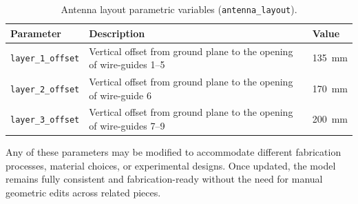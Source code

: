 \begin{table}[h!]
  \centering
  \caption[Antenna layout CAD parameters]{Antenna layout parametric variables (\texttt{antenna\_layout}).}
  \label{tab:antenna_layout_params}
  \small
  \begin{tabularx}{\textwidth}{l X l}
    \toprule
    \textbf{Parameter} & \textbf{Description} & \textbf{Value} \\
    \midrule
    \texttt{layer\_1\_offset} & Vertical offset from ground plane to the opening of wire-guides 1–5 & 135~mm \\[2pt]
    \texttt{layer\_2\_offset} & Vertical offset from ground plane to the opening of wire-guide 6 & 170~mm \\[2pt]
    \texttt{layer\_3\_offset} & Vertical offset from ground plane to the opening of wire-guides 7–9 & 200~mm \\[2pt]
    \bottomrule
  \end{tabularx}
\end{table}

Any of these parameters may be modified to accommodate different fabrication processes, material choices, or experimental designs. 
Once updated, the model remains fully consistent and fabrication-ready without the need for manual geometric edits across related pieces. 

